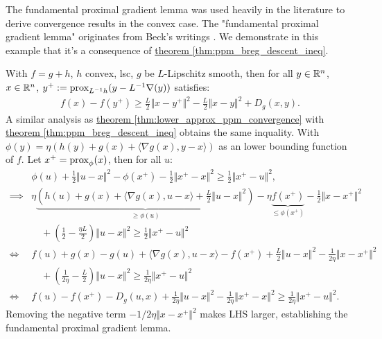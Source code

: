 \documentclass[12pt]{article}
\begin{document}
        \begin{example}
            The fundamental proximal gradient lemma was used heavily in the literature to derive convergence results in the convex case. 
            The "fundamental proximal gradient lemma" originates from Beck's writings \cite[theorem 10.16]{beck_first-order_nodate}. 
            We demonstrate in this example that it's a consequence of \hyperref[thm:ppm_breg_descent_ineq]{theorem \ref*{thm:ppm_breg_descent_ineq}}. 
            \par
            With $f = g + h$, $h$ convex, lsc, $g$ be $L$-Lipschitz smooth, then for all $y\in \mathbb R^n$, $x\in \mathbb R^n$, $y^+ := \operatorname{prox}_{L^{-1}h}(y - L^{-1}\nabla (y))$ satisfies: 
            \begin{align*}
                f(x) - f(y^+) \ge \frac{L}{2}\Vert x - y^+\Vert^2 - \frac{L}{2}\Vert x - y\Vert^2 + D_g(x, y).
            \end{align*}
            A similar analysis as \hyperref[thm:lower_approx_ppm_convergence]{ theorem \ref*{thm:lower_approx_ppm_convergence}} with \hyperref[thm:ppm_breg_descent_ineq]{theorem \ref*{thm:ppm_breg_descent_ineq}} obtains the same inquality. 
            With $\phi(y) = \eta(h(y) + g(x) + \langle \nabla g(x), y - x\rangle)$ as an lower bounding function of $f$. 
            Let $x^+ = \operatorname{prox}_\phi(x)$, then for all $u$:
            \begin{align*}
                & \phi(u) + \frac{1}{2}\Vert u - x\Vert^2 - \phi(x^+) - \frac{1}{2}\Vert x^+ - x\Vert^2 
                \ge \frac{1}{2}\Vert x^+ - u\Vert^2, 
                \\
                \implies &
                \eta\underbrace{(h(u) + g(x) + \langle \nabla g(x), u - x\rangle + \frac{L}{2}\Vert u - x\Vert^2)}_{\ge \phi(u)} 
                - \eta \underbrace{f(x^+)}_{\le \phi(x^+)} - \frac{1}{2}\Vert x - x^+\Vert^2 
                \\
                &\quad  
                + \left(
                    \frac{1}{2} - \frac{\eta L}{2}
                \right)\Vert u - x\Vert^2 
                \ge 
                \frac{1}{2}\Vert x^+ - u\Vert^2 
                \\
                \iff & 
                f(u) + g(x) - g(u) + 
                \langle \nabla g(x), u -x\rangle 
                - f(x^+) + \frac{L}{2}\Vert u - x\Vert^2 - \frac{1}{2\eta}\Vert x - x^+\Vert^2
                \\
                & \quad 
                + 
                \left(
                    \frac{1}{2\eta} - \frac{L}{2}
                \right)\Vert u - x\Vert^2 
                \ge 
                \frac{1}{2\eta}\Vert x^+ - u\Vert^2 
                \\
                \iff 
                & f(u) - f(x^+) - D_g(u, x)
                + \frac{1}{2\eta} \Vert u - x\Vert^2 - \frac{1}{2\eta}\Vert x^+ - x\Vert^2
                \ge 
                \frac{1}{2\eta} \Vert x^+ - u\Vert^2. 
            \end{align*}
            Removing the negative term $-1/2\eta \Vert x - x^+\Vert^2$ makes LHS larger, establishing the fundamental proximal gradient lemma. 
        \end{example}
\end{document}
